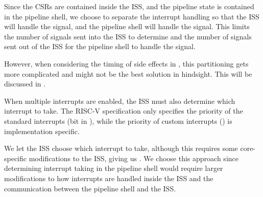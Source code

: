 Since the CSRs are contained inside the ISS, and the pipeline state is contained in the pipeline shell, we choose to separate the interrupt handling so that the ISS will handle the  signal, and the pipeline shell will handle the  signal. This limits the number of signals sent into the ISS to determine  and the number of signals sent out of the ISS for the pipeline shell to handle the  signal.

However, when considering the timing of side effects in , this partitioning gets more complicated and might not be the best solution in hindsight. This will be discussed in .



When multiple interrupts are enabled, the ISS must also determine which interrupt to take. The RISC-V specification \cite{watermanRISCVInstructionSet2021} only specifies the priority of the standard interrupts (bit  in ), while the priority of custom interrupts () is implementation specific.

We let the ISS choose which interrupt to take, although this requires some core-specific modifications to the ISS, giving us . We choose this approach since determining interrupt taking in the pipeline shell would require larger modifications to how interrupts are handled inside the ISS and the communication between the pipeline shell and the ISS.



